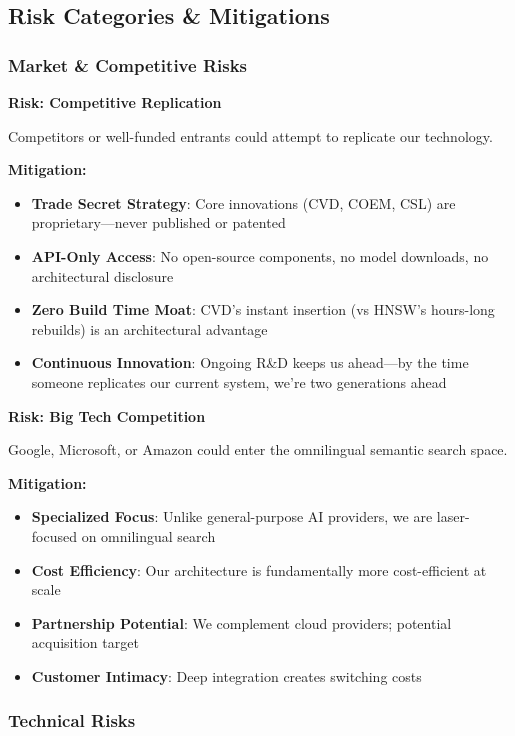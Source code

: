 \subsection{Risk Categories \& Mitigations}

\subsubsection{Market \& Competitive Risks}

\textbf{Risk: Competitive Replication}

Competitors or well-funded entrants could attempt to replicate our technology.

\textbf{Mitigation:}
\begin{itemize}[noitemsep]
    \item \textbf{Trade Secret Strategy}: Core innovations (CVD, COEM, CSL) are proprietary—never published or patented
    \item \textbf{API-Only Access}: No open-source components, no model downloads, no architectural disclosure
    \item \textbf{Zero Build Time Moat}: CVD's instant insertion (vs HNSW's hours-long rebuilds) is an architectural advantage
    \item \textbf{Continuous Innovation}: Ongoing R\&D keeps us ahead—by the time someone replicates our current system, we're two generations ahead
\end{itemize}

\textbf{Risk: Big Tech Competition}

Google, Microsoft, or Amazon could enter the omnilingual semantic search space.

\textbf{Mitigation:}
\begin{itemize}[noitemsep]
    \item \textbf{Specialized Focus}: Unlike general-purpose AI providers, we are laser-focused on omnilingual search
    \item \textbf{Cost Efficiency}: Our architecture is fundamentally more cost-efficient at scale
    \item \textbf{Partnership Potential}: We complement cloud providers; potential acquisition target
    \item \textbf{Customer Intimacy}: Deep integration creates switching costs
\end{itemize}

\subsubsection{Technical Risks}

